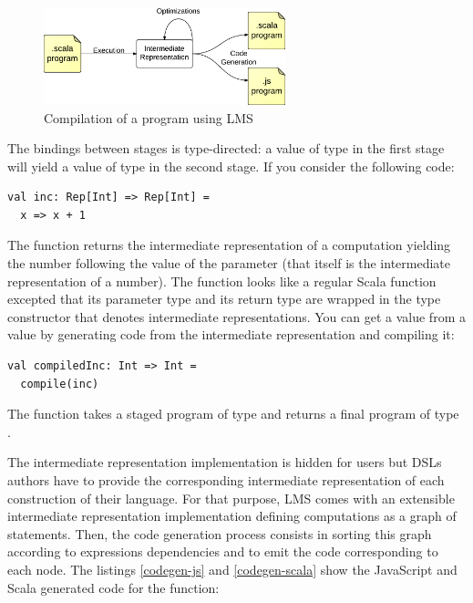 \documentclass[american,english,runningheads]{llncs}
\begin{document}
\begin{figure}
  \centering
  \includegraphics[width=7cm]{lms.pdf}
  \caption{Compilation of a program using LMS}
  \label{lms-diagram}
\end{figure}

The bindings between stages is type-directed: a value of type  in the first stage will yield a value of type  in the second stage. If you consider the following code:
\begin{lstlisting}
val inc: Rep[Int] => Rep[Int] =
  x => x + 1
\end{lstlisting}
The  function returns the intermediate representation of a computation yielding the number following the value of the parameter  (that itself is the intermediate representation of a number). The function looks like a regular Scala function excepted that its parameter type and its return type are wrapped in the  type constructor that denotes intermediate representations. You can get a  value from a  value by generating code from the intermediate representation and compiling it:
\begin{lstlisting}
val compiledInc: Int => Int =
  compile(inc)
\end{lstlisting}
The  function takes a staged program of type  and returns a final program of type .

The intermediate representation implementation is hidden for users but DSLs authors have to provide the corresponding intermediate representation of each construction of their language. For that purpose, LMS comes with an extensible intermediate representation implementation defining computations as a graph of statements. Then, the code generation process consists in sorting this graph according to expressions dependencies and to emit the code corresponding to each node. The listings \ref{codegen-js} and \ref{codegen-scala} show the JavaScript and Scala generated code for the  function:
\begin{multicols}{2}


\end{multicols}
\end{document}
